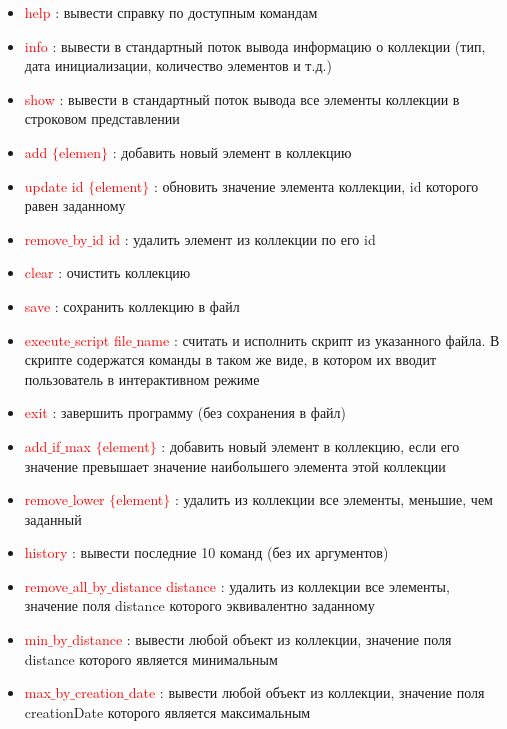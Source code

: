 \documentclass[12pt,onecolumn]{article}
\begin{document}
\begin{itemize}
    \item \textcolor{red}{help} : вывести справку по доступным командам
    \item \textcolor{red}{info} : вывести в стандартный поток вывода информацию о коллекции (тип, дата инициализации, количество элементов и т.д.)
    \item \textcolor{red}{show} : вывести в стандартный поток вывода все элементы коллекции в строковом представлении
    \item \textcolor{red}{add $\{$elemen$\}$} : добавить новый элемент в коллекцию
    \item \textcolor{red}{update id $\{$element$\}$} : обновить значение элемента коллекции, id которого равен заданному
    \item \textcolor{red}{remove$\_$by$\_$id id} : удалить элемент из коллекции по его id
    \item \textcolor{red}{clear} : очистить коллекцию
    \item \textcolor{red}{save} : сохранить коллекцию в файл
    \item \textcolor{red}{execute$\_$script file$\_$name} : считать и исполнить скрипт из указанного файла. В скрипте содержатся команды в таком же виде, в котором их вводит пользователь в интерактивном режиме
    \item \textcolor{red}{exit} : завершить программу (без сохранения в файл)
    \item \textcolor{red}{add$\_$if$\_$max $\{$element$\}$} : добавить новый элемент в коллекцию, если его значение превышает значение наибольшего элемента этой коллекции
    \item \textcolor{red}{remove$\_$lower $\{$element$\}$} : удалить из коллекции все элементы, меньшие, чем заданный
    \item \textcolor{red}{history} : вывести последние 10 команд (без их аргументов)
    \item \textcolor{red}{remove$\_$all$\_$by$\_$distance distance} : удалить из коллекции все элементы, значение поля distance которого эквивалентно заданному
    \item \textcolor{red}{min$\_$by$\_$distance} : вывести любой объект из коллекции, значение поля distance которого является минимальным
    \item \textcolor{red}{max$\_$by$\_$creation$\_$date} : вывести любой объект из коллекции, значение поля creationDate которого является максимальным
\end{itemize}
\end{document}
